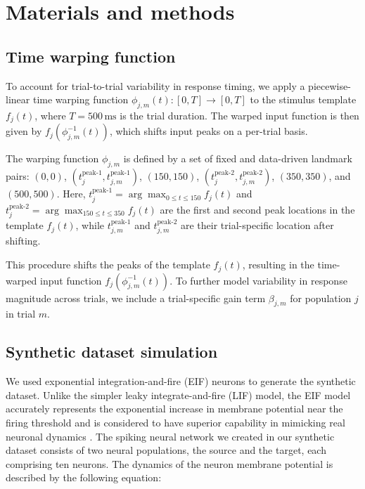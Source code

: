\documentclass[12pt]{article}
\begin{document}
\section{Materials and methods}

\subsection{Time warping function}
\label{sec:Time warping function}

To account for trial-to-trial variability in response timing, we apply a piecewise-linear time warping function $\phi_{j,m}(t): [0, T] \rightarrow [0, T]$ to the stimulus template $f_j(t)$, where \( T = 500 \, \text{ms} \) is the trial duration. The warped input function is then given by \( f_j(\phi^{-1}_{j,m}(t)) \), which shifts input peaks on a per-trial basis.

The warping function $\phi_{j,m}$ is defined by a set of fixed and data-driven landmark pairs: $(0, 0)$, $(t_{j}^{\text{peak-1}}, t_{j,m}^{\text{peak-1}})$, $(150, 150)$, $(t_{j}^{\text{peak-2}}, t_{j,m}^{\text{peak-2}})$, $(350, 350)$, and $(500, 500)$. Here, $t_{j}^{\text{peak-1}} = \arg\max_{0 \leq t \leq 150} f_j(t)$ and $t_{j}^{\text{peak-2}} = \arg\max_{150 \leq t \leq 350} f_j(t)$ are the first and second peak locations in the template $f_j(t)$, while $t_{j,m}^{\text{peak-1}}$ and $t_{j,m}^{\text{peak-2}}$ are their trial-specific location after shifting.

This procedure shifts the peaks of the template $f_j(t)$, resulting in the time-warped input function $f_j(\phi^{-1}_{j,m}(t))$. To further model variability in response magnitude across trials, we include a trial-specific gain term $\beta_{j,m}$ for population $j$ in trial $m$.


\subsection{Synthetic dataset simulation}

We used exponential integration-and-fire (EIF) neurons \cite{fourcaud2003spike, gerstner2014neuronal, huang2019circuit} to generate the synthetic dataset. Unlike the simpler leaky integrate-and-fire (LIF) model, the EIF model accurately represents the exponential increase in membrane potential near the firing threshold and is considered to have superior capability in mimicking real neuronal dynamics \cite{fourcaud2003spike}. The spiking neural network we created in our synthetic dataset consists of two neural populations, the source and the target, each comprising ten neurons. The dynamics of the neuron membrane potential is described by the following equation:
\end{document}
